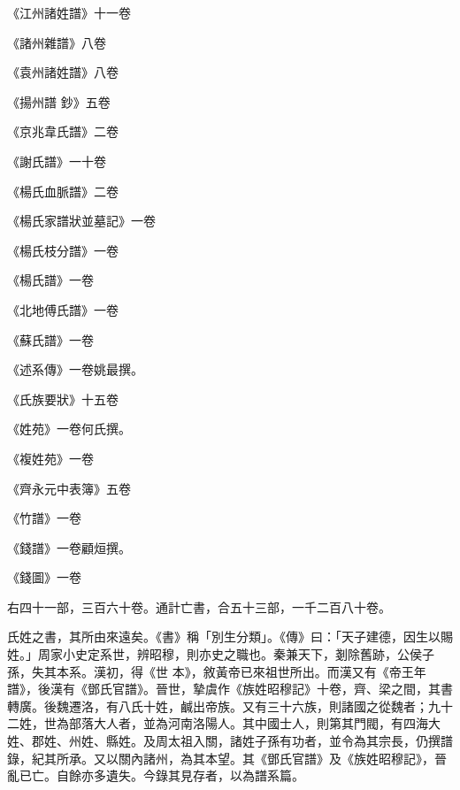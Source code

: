 \begin{pinyinscope}
 《江州諸姓譜》十一卷



 《諸州雜譜》八卷



 《袁州諸姓譜》八卷



 《揚州譜
 鈔》五卷



 《京兆韋氏譜》二卷



 《謝氏譜》一十卷



 《楊氏血脈譜》二卷



 《楊氏家譜狀並墓記》一卷



 《楊氏枝分譜》一卷



 《楊氏譜》一卷



 《北地傅氏譜》一卷



 《蘇氏譜》一卷



 《述系傳》一卷姚最撰。



 《氏族要狀》十五卷



 《姓苑》一卷何氏撰。



 《複姓苑》一卷



 《齊永元中表簿》五卷



 《竹譜》一卷



 《錢譜》一卷顧烜撰。



 《錢圖》一卷



 右四十一部，三百六十卷。通計亡書，合五十三部，一千二百八十卷。



 氏姓之書，其所由來遠矣。《書》稱「別生分類」。《傳》曰：「天子建德，因生以賜姓。」周家小史定系世，辨昭穆，則亦史之職也。秦兼天下，剗除舊跡，公侯子孫，失其本系。漢初，得《世
 本》，敘黃帝已來祖世所出。而漢又有《帝王年譜》，後漢有《鄧氏官譜》。晉世，摯虞作《族姓昭穆記》十卷，齊、梁之間，其書轉廣。後魏遷洛，有八氏十姓，鹹出帝族。又有三十六族，則諸國之從魏者；九十二姓，世為部落大人者，並為河南洛陽人。其中國士人，則第其門閥，有四海大姓、郡姓、州姓、縣姓。及周太祖入關，諸姓子孫有功者，並令為其宗長，仍撰譜錄，紀其所承。又以關內諸州，為其本望。其《鄧氏官譜》及《族姓昭穆記》，晉亂已亡。自餘亦多遺失。今錄其見存者，以為譜系篇。




\end{pinyinscope}
